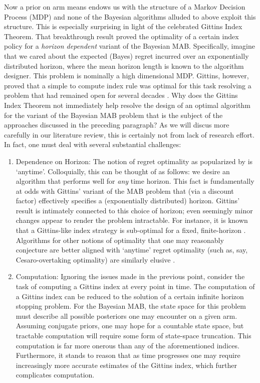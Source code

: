 Now a prior on arm means endows us with the structure of a Markov Decision Process (MDP) and none of the Bayesian algorithms alluded to above exploit this structure. This is especially surprising in light of the celebrated Gittins Index Theorem. That breakthrough result proved the optimality of a certain index policy for a {\em horizon dependent} variant of the Bayesian MAB. Specifically, imagine that we cared about the expected (Bayes) regret incurred over an exponentially distributed horizon, where the mean horizon length is known to the algorithm designer. This problem is nominally a high dimensional MDP. Gittins, however, proved that a simple to compute index rule was optimal for this task resolving a problem that had remained open for several decades \cite{}. Why does the Gittins Index Theorem not immediately help resolve the design of an optimal algorithm for the variant of the Bayesian MAB problem that is the subject of the approaches discussed in the preceding paragraph? As we will discus more carefully in our literature review, this is certainly not from lack of research effort. In fact, one must deal with several substantial challenges:
\begin{enumerate}
\item
Dependence on Horizon: The notion of regret optimality as popularized by \cite{lai1985asymptotically} is `anytime'. Colloquially, this can be thought of as follows: we desire an algorithm that performs well for {\em any} time horizon. This fact is fundamentally at odds with Gittins' variant of the MAB problem that (via a discount factor) effectively specifies a (exponentially distributed) horizon. Gittins' result is intimately connected to this choice of horizon; even seemingly minor changes appear to render the problem intractable. For instance, it is known that a Gittins-like index strategy is sub-optimal for a fixed, finite-horizon \citep{berry1985bandit}. Algorithms for other notions of optimality that one may reasonably conjecture are better aligned with `anytime' regret optimality (such as, say, Cesaro-overtaking optimality) are similarly elusive \cite{katehakis1996finite}.  
\item
Computation: Ignoring the issues made in the previous point, consider the task of computing a Gittins index at every point in time. 
The computation of a Gittins index can be reduced to the solution of a certain infinite horizon stopping problem. For the Bayesian MAB, the state space for this problem must describe all possible posteriors one may encounter on a given arm. Assuming conjugate priors, one may hope for a countable state space, but tractable computation will require some form of state-space truncation. This computation is far more onerous than any of the aforementioned indices. Furthermore, it stands to reason that as time progresses one may require increasingly more accurate estimates of the Gittins index, which further complicates computation.  
\end{enumerate}

